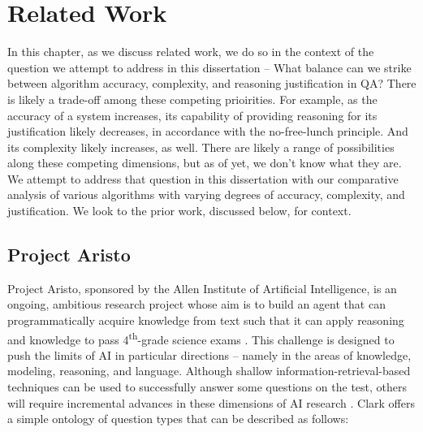  
\chapter{Related Work}

In this chapter, as we discuss related work, we do so in the context of the question we attempt to address in this dissertation -- What balance can we strike between algorithm accuracy, complexity, and reasoning justification in QA?  There is likely a trade-off among these competing prioirities.  For example, as the accuracy of a system increases, its capability of providing reasoning for its justification likely decreases, in accordance with the no-free-lunch principle.  And its complexity likely increases, as well.  There are likely a range of possibilities along these competing dimensions, but as of yet, we don't know what they are.  We attempt to address that question in this dissertation with our comparative analysis of various algorithms with varying degrees of accuracy, complexity, and justification.  We look to the prior work, discussed below, for context.

\section{Project Aristo}

Project Aristo, sponsored by the Allen Institute of Artificial Intelligence, is an ongoing, ambitious research project  whose aim is to build an agent that can programmatically acquire knowledge from text such that it can apply reasoning and knowledge to pass 4\textsuperscript{th}-grade science exams \cite{clark2015elementary}.  This challenge is designed to push the limits of AI in particular directions -- namely in the areas of knowledge, modeling, reasoning, and language.  Although shallow information-retrieval-based techniques can be used to successfully answer some questions on the test, others will require incremental advances in these dimensions of AI research \cite{clark2015elementary}.  Clark \cite{clark2015elementary} offers a simple ontology of question types that can be described as follows:


